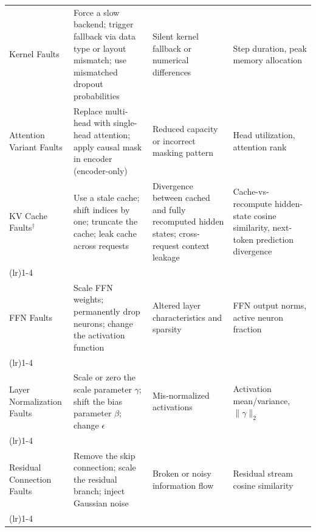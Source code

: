 \begin{table}[!htbp]
\begin{tabularx}{\linewidth}{@{}
  l
  >{\raggedright\arraybackslash}X
  >{\raggedright\arraybackslash}X
  >{\raggedright\arraybackslash}X @{}}
Kernel Faults &
Force a slow backend; trigger fallback via data type or layout mismatch; use mismatched dropout probabilities &
Silent kernel fallback or numerical differences \citep{dao2022flashattention,liang2025attnchecker} &
Step duration, peak memory allocation~\cite{nvidia2021dlprof,chakrabarti2012cuda} \\
Attention Variant Faults &
Replace multi-head with single-head attention; apply causal mask in encoder (encoder-only) &
Reduced capacity or incorrect masking pattern \citep{michel2019sixteen,sandoval2025even} &
Head utilization, attention rank~\cite{michel2019sixteen,voita2019analyzing}\\
KV Cache Faults$^{\dagger}$ &
Use a stale cache; shift indices by one; truncate the cache; leak cache across requests &
Divergence between cached and fully recomputed hidden states; cross-request context leakage \citep{zhang2024layer,jiang2025foundation} &
Cache-vs-recompute hidden-state cosine similarity, next-token prediction divergence~\cite{zhang2024layer,jiang2025foundation} \\
\addlinespace[0.3ex]
\cmidrule(lr){1-4}
\addlinespace[0.2ex]
\multicolumn{4}{c}{\textit{--- Feed-Forward Network ---}} \\
\addlinespace[0.2ex]
FFN Faults &
Scale FFN weights; permanently drop neurons; change the activation function &
Altered layer characteristics and sparsity \citep{zhang2024transformerdoctor} &
FFN output norms, active neuron fraction~\cite{zhang2024transformerdoctor} \\
\addlinespace[0.3ex]
\cmidrule(lr){1-4}
\addlinespace[0.2ex]
\multicolumn{4}{c}{\textit{--- Layer Normalization ---}} \\
\addlinespace[0.2ex]
Layer Normalization Faults &
Scale or zero the scale parameter $\gamma$; shift the bias parameter $\beta$; change $\epsilon$ &
Mis-normalized activations \citep{xiong2020layer,mosbach2021stability} &
Activation mean/variance, $\|\gamma\|_2$ \citep{wortsman2024small} \\
\addlinespace[0.3ex]
\cmidrule(lr){1-4}
\addlinespace[0.2ex]
\multicolumn{4}{c}{\textit{--- Residual Connection ---}} \\
\addlinespace[0.2ex]
Residual Connection Faults &
Remove the skip connection; scale the residual branch; inject Gaussian noise &
Broken or noisy information flow \citep{vaswani2017attention,dong2021attention} &
Residual stream cosine similarity \citep{naitsaada2024mind} \\
\addlinespace[0.3ex]
\cmidrule(lr){1-4}
\addlinespace[0.2ex]

\end{tabularx}
\end{table}
